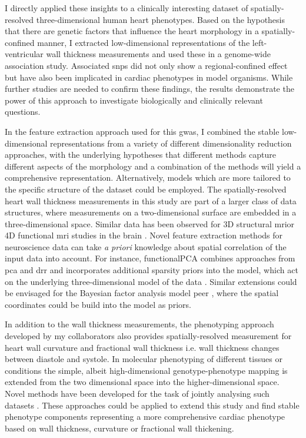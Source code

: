 I directly applied these insights to a clinically interesting dataset of spatially-resolved three-dimensional human heart phenotypes. Based on the hypothesis that there are genetic factors that influence the heart morphology in a spatially-confined manner, I extracted low-dimensional representations of the left-ventricular wall thickness measurements and used these in a genome-wide association study. Associated \glspl{snp} did not only show a regional-confined effect but have also been implicated in cardiac phenotypes in model organisms. While further studies are needed to confirm these findings, the results demonstrate the power of this approach to investigate biologically and clinically relevant questions.

In the feature extraction approach used for this \gls{gwas}, I combined the stable low-dimensional representations from a variety of different dimensionality reduction approaches, with the underlying hypotheses that different methods capture different aspects of the morphology and a combination of the methods will yield a comprehensive representation. Alternatively, models which are more tailored to the specific structure of the dataset could be employed. The spatially-resolved heart wall thickness measurements in this study are part of a larger class of data structures, where measurements on a two-dimensional surface are embedded in a three-dimensional space. Similar data has been observed for 3D structural \gls{mri}or 4D functional \gls{mri} studies in the brain \citep{vanEssen2012,Glasser2013}. Novel feature extraction methods for neuroscience data can take \textit{a priori} knowledge about spatial correlation of the input data into account. For instance, functionalPCA combines approaches from \gls{pca} and \gls{drr} and incorporates additional sparsity priors into the model, which act on the underlying three-dimensional model of the data \citep{Lila2016}. Similar extensions could be envisaged for the Bayesian factor analysis model \gls{peer} \citep{Stegle2012}, where the spatial coordinates could be build into the model as priors.

In addition to the wall thickness measurements, the phenotyping approach developed by my collaborators also provides spatially-resolved measurement for heart wall curvature and fractional wall thickness i.e. wall thickness changes between diastole and systole. In molecular phenotyping of different tissues or conditions the simple, albeit high-dimensional genotype-phenotype mapping is extended from the two dimensional  space into the higher-dimensional  space. Novel methods have been developed for the task of jointly analysing such datasets \citep{Hore2016}. These approaches could be applied to extend this study and find stable phenotype components representing a more comprehensive cardiac phenotype based on wall thickness, curvature or fractional wall thickening. 

